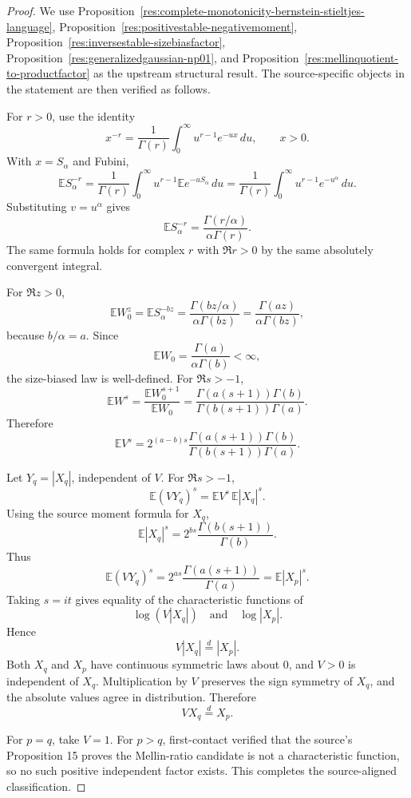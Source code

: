 \documentclass[11pt]{article}
\numberwithin{equation}{section}
\theoremstyle{definition}
\theoremstyle{remark}
\newcommand{\1}{\mathbf 1}
\begin{document}
\begin{proof}
We use Proposition~\ref{res:complete-monotonicity-bernstein-stieltjes-language}, Proposition~\ref{res:positivestable-negativemoment}, Proposition~\ref{res:inversestable-sizebiasfactor}, Proposition~\ref{res:generalizedgaussian-np01}, and Proposition~\ref{res:mellinquotient-to-productfactor} as the upstream structural result. The source-specific objects in the statement are then verified as follows.

For \(r>0\), use the identity
\[
x^{-r}=\frac1{\Gamma(r)}\int_0^\infty u^{r-1}e^{-ux}\,du,\qquad x>0.
\]
With \(x=S_\alpha\) and Fubini,
\[
\mathbb E S_\alpha^{-r}
=
\frac1{\Gamma(r)}\int_0^\infty u^{r-1}\mathbb E e^{-uS_\alpha}\,du
=
\frac1{\Gamma(r)}\int_0^\infty u^{r-1}e^{-u^\alpha}\,du.
\]
Substituting \(v=u^\alpha\) gives
\[
\mathbb E S_\alpha^{-r}
=
\frac{\Gamma(r/\alpha)}{\alpha\Gamma(r)}.
\]
The same formula holds for complex \(r\) with \(\Re r>0\) by the same absolutely convergent integral.

For \(\Re z>0\),
\[
\mathbb E W_0^z
=
\mathbb E S_\alpha^{-bz}
=
\frac{\Gamma(bz/\alpha)}{\alpha\Gamma(bz)}
=
\frac{\Gamma(az)}{\alpha\Gamma(bz)},
\]
because \(b/\alpha=a\). Since
\[
\mathbb E W_0=\frac{\Gamma(a)}{\alpha\Gamma(b)}<\infty,
\]
the size-biased law is well-defined. For \(\Re s>-1\),
\[
\mathbb E W^s
=
\frac{\mathbb E W_0^{s+1}}{\mathbb E W_0}
=
\frac{\Gamma(a(s+1))\Gamma(b)}
        {\Gamma(b(s+1))\Gamma(a)}.
\]
Therefore
\[
\mathbb E V^s
=
2^{(a-b)s}
\frac{\Gamma(a(s+1))\Gamma(b)}
     {\Gamma(b(s+1))\Gamma(a)}.
\]

Let \(Y_q=|X_q|\), independent of \(V\). For \(\Re s>-1\),
\[
\mathbb E (VY_q)^s
=
\mathbb E V^s\,\mathbb E |X_q|^s.
\]
Using the source moment formula for \(X_q\),
\[
\mathbb E |X_q|^s
=
2^{bs}\frac{\Gamma(b(s+1))}{\Gamma(b)}.
\]
Thus
\[
\mathbb E (VY_q)^s
=
2^{as}\frac{\Gamma(a(s+1))}{\Gamma(a)}
=
\mathbb E |X_p|^s.
\]
Taking \(s=it\) gives equality of the characteristic functions of
\[
\log(V|X_q|)
\quad\text{and}\quad
\log|X_p|.
\]
Hence
\[
V|X_q|\stackrel d=|X_p|.
\]
Both \(X_q\) and \(X_p\) have continuous symmetric laws about \(0\), and \(V>0\) is independent of \(X_q\). Multiplication by \(V\) preserves the sign symmetry of \(X_q\), and the absolute values agree in distribution. Therefore
\[
VX_q\stackrel d=X_p.
\]

For \(p=q\), take \(V=1\). For \(p>q\), first-contact verified that the source's Proposition 15 proves the Mellin-ratio candidate is not a characteristic function, so no such positive independent factor exists. This completes the source-aligned classification.
\end{proof}
\end{document}
